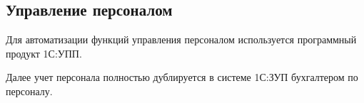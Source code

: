 \subsection{Управление персоналом}
%
Для автоматизации функций управления персоналом используется программный продукт 1С:УПП.

Далее учет персонала полностью дублируется в системе 1С:ЗУП бухгалтером по персоналу.
